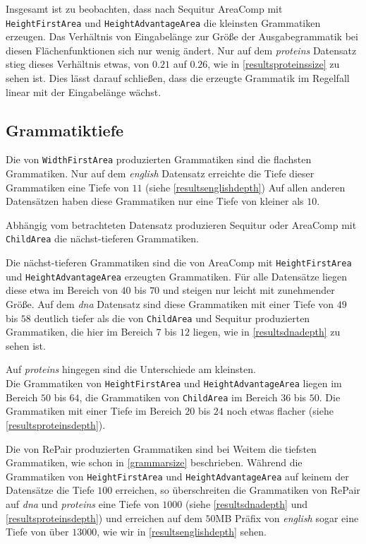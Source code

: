 Insgesamt ist zu beobachten, dass nach Sequitur AreaComp mit \texttt{HeightFirstArea} und \texttt{HeightAdvantageArea} die kleinsten Grammatiken erzeugen. Das Verhältnis von Eingabelänge zur Größe der Ausgabegrammatik bei diesen Flächenfunktionen sich nur wenig ändert. Nur auf dem \emph{proteins} Datensatz stieg dieses Verhältnis etwas, von $0.21$ auf $0.26$, wie in \autoref{resultsproteinssize} zu sehen ist. Dies lässt darauf schließen, dass die erzeugte Grammatik im Regelfall linear mit der Eingabelänge wächst.

\subsection{Grammatiktiefe}

Die von \texttt{WidthFirstArea} produzierten Grammatiken sind die flachsten Grammatiken. Nur auf dem \emph{english} Datensatz erreichte die Tiefe dieser Grammatiken eine Tiefe von $11$ (siehe \autoref{resultsenglishdepth}) Auf allen anderen Datensätzen haben diese Grammatiken nur eine Tiefe von kleiner als $10$.

Abhängig vom betrachteten Datensatz produzieren Sequitur oder AreaComp mit \\
\texttt{ChildArea} die nächst-tieferen Grammatiken. 

Die nächst-tieferen Grammatiken sind die von AreaComp mit 
\texttt{HeightFirstArea} und \texttt{HeightAdvantageArea} erzeugten Grammatiken. Für alle Datensätze liegen diese etwa im Bereich von $40$ bis $70$ und steigen nur leicht mit zunehmender Größe.
Auf dem \emph{dna} Datensatz sind diese Grammatiken mit einer Tiefe von $49$ bis $58$ deutlich tiefer als die von \texttt{ChildArea} und Sequitur produzierten Grammatiken, die hier im Bereich $7$ bis $12$ liegen, wie in \autoref{resultsdnadepth} zu sehen ist.

Auf \emph{proteins} hingegen sind die Unterschiede am kleinsten.\\
Die Grammatiken von \texttt{HeightFirstArea} und \texttt{HeightAdvantageArea} liegen im Bereich $50$ bis $64$, die Grammatiken von \texttt{ChildArea} im Bereich $36$ bis $50$. Die Grammatiken mit einer Tiefe im Bereich $20$ bis $24$ noch etwas flacher (siehe \autoref{resultsproteinsdepth}). 

Die von RePair produzierten Grammatiken sind bei Weitem die tiefsten Grammatiken, wie schon in \autoref{grammarsize} beschrieben. Während die Grammatiken von \texttt{HeightFirstArea} und \texttt{HeightAdvantageArea} auf keinem der Datensätze die Tiefe $100$ erreichen, so überschreiten die Grammatiken von RePair auf \emph{dna} und \emph{proteins} eine Tiefe von $1000$ (siehe \autoref{resultsdnadepth} und \autoref{resultsproteinsdepth}) und erreichen auf dem $50$MB Präfix von \emph{english} sogar eine Tiefe von über $13000$, wie wir in \autoref{resultsenglishdepth} sehen.

